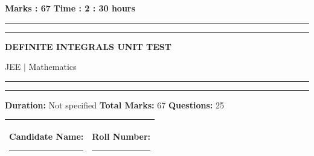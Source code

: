 \documentclass[11pt,a4paper]{article}
\begin{document}
\vspace{2mm}
\noindent \textbf{Marks : 67} \hfill \textbf{Time : 2 : 30 hours}
\noindent\rule{\linewidth}{1.1pt}\vspace{-1mm}\noindent\rule{\linewidth}{0.5pt}
{\centering \Large \textbf{DEFINITE INTEGRALS UNIT TEST}\par}
{\centering JEE $|$ Mathematics\par}
\noindent\rule{\linewidth}{1.1pt}\vspace{-1mm}\noindent\rule{\linewidth}{0.5pt}
\vspace{1mm}
\noindent \textbf{Duration:} Not specified \quad \textbf{Total Marks:} 67 \quad \textbf{Questions:} 25\par
\vspace{2mm}

\begin{tabularx}{\linewidth}{|X|X|}\hline
Candidate Name: \rule{6cm}{0.4pt} & Roll Number: \rule{3.5cm}{0.4pt} \\\hline
\end{tabularx}
\end{document}
